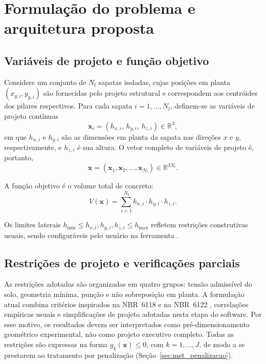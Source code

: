 \section{Formulação do problema e arquitetura proposta}
\label{sec:metodologia}

\subsection{Variáveis de projeto e função objetivo}
\label{sec:met_variaveis}

Considere um conjunto de $N_{\mathrm{f}}$ sapatas isoladas, cujas posições em planta $(x_{g,i}, y_{g,i})$ são fornecidas pelo projeto estrutural e correspondem aos centróides dos pilares respectivos. Para cada sapata $i = 1, \dots, N_{\mathrm{f}}$, definem-se as variáveis de projeto contínuas
\begin{equation}
    \bm{x}_i = (h_{x,i},\, h_{y,i},\, h_{z,i}) \in \mathbb{R}^3,
    \label{eq:vars_local}
\end{equation}
em que $h_{x,i}$ e $h_{y,i}$ são as dimensões em planta da sapata nas direções $x$ e $y$, respectivamente, e $h_{z,i}$ é sua altura. O vetor completo de variáveis de projeto é, portanto,
\begin{equation}
    \bm{x} = (\bm{x}_1, \bm{x}_2, \dots, \bm{x}_{N_{\mathrm{f}}}) \in \mathbb{R}^{3 N_{\mathrm{f}}}.
    \label{eq:vars_global}
\end{equation}

A função objetivo é o volume total de concreto:
\begin{equation}
    V(\bm{x}) = \sum_{i=1}^{N_{\mathrm{f}}} h_{x,i} \cdot h_{y,i} \cdot h_{z,i}.
    \label{eq:volume}
\end{equation}

Os limites laterais $h_{\min} \le h_{x,i}, h_{y,i}, h_{z,i} \le h_{\max}$ refletem restrições construtivas usuais, sendo configuráveis pelo usuário na ferramenta \fundaai{}.

\subsection{Restrições de projeto e verificações parciais}
\label{sec:met_restricoes}

As restrições adotadas são organizadas em quatro grupos: tensão admissível do solo, geometria mínima, punção e não sobreposição em planta. A formulação atual combina critérios inspirados na NBR~6118  e na NBR~6122 , correlações empíricas usuais e simplificações de projeto adotadas nesta etapa do software. Por esse motivo, os resultados devem ser interpretados como pré-dimensionamento geométrico experimental, não como projeto executivo completo. Todas as restrições são expressas na forma $g_k(\bm{x}) \le 0$, com $k = 1, \dots, J$, de modo a se prestarem ao tratamento por penalização (Seção~\ref{sec:met_penalizacao}).

